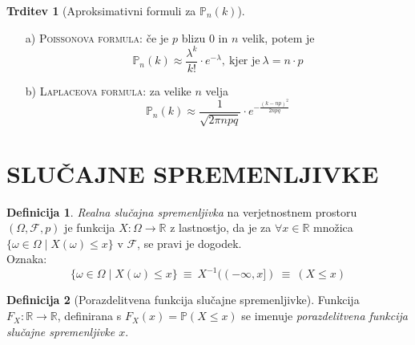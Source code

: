 \documentclass[11pt]{article}
\theoremstyle{definition}
\newtheorem{definicija}{Definicija}[section]
\theoremstyle{definition}
\newtheorem{trditev}{Trditev}[section]
\theoremstyle{definition}
\begin{document}
\begin{trditev}[Aproksimativni formuli za $\mathbb{P}_n(k)$]

~\\
\begin{enumerate}
	\item[a)] \textsc{Poissonova formula}: če je $p$ blizu $0$ in $n$ velik, potem je
	$$\mathbb{P}_n(k) \approx \frac{\lambda^k}{k!} \cdot e^{-\lambda}, ~\text{kjer je}~ \lambda = n \cdot p$$
	\item[b)] \textsc{Laplaceova formula}: za velike $n$ velja
	$$\mathbb{P}_n(k) \approx \frac{1}{\sqrt{2 \pi n p q}} \cdot e^{-\frac{(k-np)^2}{2npq}}$$
\end{enumerate}

\end{trditev}
\vspace{0.5cm}


\pagebreak


\section{SLUČAJNE SPREMENLJIVKE}
\vspace{0.5cm}

\begin{definicija}

\textit{Realna slučajna spremenljivka} na verjetnostnem prostoru $(\Omega, \mathcal{F}, p)$ je funkcija $X: \Omega \rightarrow \mathbb{R}$ z lastnostjo, da je za $\forall x \in \mathbb{R}$ množica $\{ \omega \in \Omega \mid X(\omega) \leq x \}$ v $\mathcal{F}$, se pravi je dogodek.\\

\noindent Oznaka:
$$\{ \omega \in \Omega \mid X(\omega) \leq x \} ~\equiv~ X^{-1}((-\infty, x]) ~\equiv~ (X \leq x)$$

\end{definicija}
\vspace{0.5cm}

\begin{definicija}[Porazdelitvena funkcija slučajne spremenljivke]

Funkcija $F_X: \mathbb{R} \rightarrow \mathbb{R}$, definirana s $F_X(x) = \mathbb{P}(X \leq x)$ se imenuje \textit{porazdelitvena funkcija slučajne spremenljivke $x$}.

\end{definicija}
\vspace{0.5cm}
\end{document}
